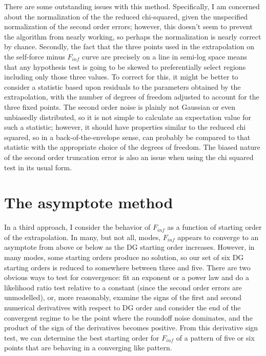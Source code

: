 There are some outstanding issues with this method. Specifically, I am concerned about the normalization of the the reduced chi-squared, given the unspecified normalization of the second order errors; however, this doesn't seem to prevent the algorithm from nearly working, so perhaps the normalization is nearly correct by chance. Secondly, the fact that the three points used in the extrapolation on the self-force minus $F_{inf}$ curve are precisely on a line in semi-log space means that any hypothesis test is going to be skewed to preferentially select regions including only those three values. To correct for this, it might be better to consider a statistic based upon residuals to the parameters obtained by the extrapolation, with the number of degrees of freedom adjusted to account for the three fixed points. The second order noise is plainly not Gaussian or even unbiasedly distributed, so it is not simple to calculate an expectation value for such a statistic; however, it should have properties similar to the reduced chi squared, so in a back-of-the-envelope sense, can probably be compared to that statistic with the appropriate choice of the degrees of freedom. The biased nature of the second order truncation error is also an issue when using the chi squared test in its usual form. 



\section{The asymptote method}

In a third approach, I consider the behavior of $F_{inf}$ as a function of starting order of the extrapolation. In many, but not all, modes, $F_{inf}$ appears to converge to an asymptote from above or below as the DG starting order increases. However, in many modes, some starting orders produce no solution, so our set of six DG starting orders is reduced to somewhere between three and five. There are two obvious ways to test for convergence: fit an exponent or a power law and do a likelihood ratio test relative to a constant (since the second order errors are unmodelled), or, more reasonably, examine the signs of the first and second numerical derivatives with respect to DG order and consider the end of the convergent regime to be the point where the roundoff noise dominates, and the product of the sign of the derivatives becomes positive. From this derivative sign test, we can determine the best starting order for $F_{inf}$ of a pattern of five or six points that are behaving in a converging like pattern.

